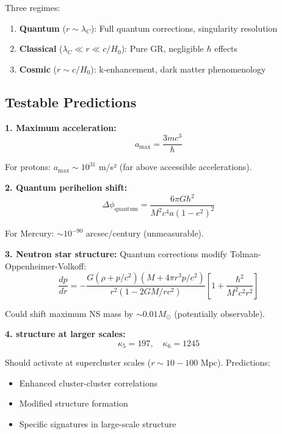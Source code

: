 \documentclass[11pt,a4paper]{article}
\theoremstyle{definition}
\theoremstyle{remark}
\begin{document}
	Three regimes:
	\begin{enumerate}
		\item \textbf{Quantum} ($r \sim \lambda_C$): Full quantum corrections, singularity resolution
		\item \textbf{Classical} ($\lambda_C \ll r \ll c/H_0$): Pure GR, negligible $\hbar$ effects  
		\item \textbf{Cosmic} ($r \sim c/H_0$): k-enhancement, dark matter phenomenology
	\end{enumerate}
	
	\subsection{Testable Predictions}
	
	\textbf{1. Maximum acceleration:}
	\begin{equation}
		a_{\max} = \frac{3mc^3}{\hbar}
	\end{equation}
	
	For protons: $a_{\max} \sim 10^{31}$ m/s² (far above accessible accelerations).
	
	\textbf{2. Quantum perihelion shift:}
	\begin{equation}
		\Delta\phi_{\text{quantum}} = \frac{6\pi G\hbar^2}{M^2c^4a(1-e^2)^2}
	\end{equation}
	
	For Mercury: $\sim 10^{-90}$ arcsec/century (unmeasurable).
	
	\textbf{3. Neutron star structure:}
	Quantum corrections modify Tolman-Oppenheimer-Volkoff:
	\begin{equation}
		\frac{dp}{dr} = -\frac{G(\rho + p/c^2)(M + 4\pi r^3 p/c^2)}{r^2(1-2GM/rc^2)}\left[1 + \frac{\hbar^2}{M^2c^2r^2}\right]
	\end{equation}
	
	Could shift maximum NS mass by $\sim 0.01 M_\odot$ (potentially observable).
	
	\textbf{4. structure at larger scales:}
	\begin{equation}
		\kappa_5 = 197, \quad \kappa_6 = 1245
	\end{equation}
	
	Should activate at supercluster scales ($r \sim 10-100$ Mpc). Predictions:
	\begin{itemize}
		\item Enhanced cluster-cluster correlations
		\item Modified structure formation
		\item Specific signatures in large-scale structure
	\end{itemize}
	
\end{document}
